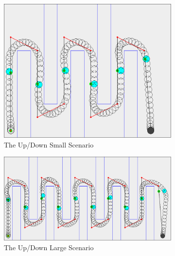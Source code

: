 \begin{figure}
	\centering
	
	\begin{subfigure}[t]{0.5\textwidth}
        		\includegraphics[width=\textwidth]{img/bench-small}
        		\caption{The Up/Down Small Scenario}
        		\label{fig:bench-small}
	\end{subfigure}
	\par\bigskip
	\begin{subfigure}[t]{0.6\textwidth}
        		\includegraphics[width=\textwidth]{img/bench-large}
        		\caption{The Up/Down Large Scenario}
        		\label{fig:bench-large}
	\end{subfigure}	
	\par\bigskip
	\begin{subfigure}[t]{0.5\textwidth}

\end{subfigure}
\end{figure}

